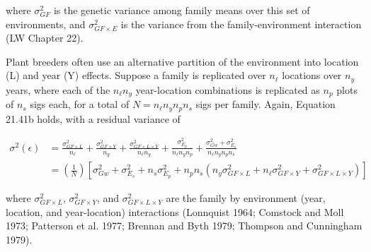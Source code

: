 \documentclass{article}
\begin{document}
where  $ \sigma_{GF}^{2} $ is the genetic variance among family means over this set of environments, and  $ \sigma_{GF \times E}^{2} $ is the variance from the family-environment interaction (LW Chapter 22).

Plant breeders often use an alternative partition of the environment into location (L) and year (Y) effects. Suppose a family is replicated over  $ n_\ell $ locations over  $ n_y $ years, where each of the  $ n_\ell n_y $ year-location combinations is replicated as  $ n_p $ plots of  $ n_s $ sigs each, for a total of  $ N = n_\ell n_y n_p n_s $ sigs per family. Again, Equation 21.41b holds, with a residual variance of

\begin{equation}
\begin{align*}\sigma^{2}(\epsilon)&=\frac{\sigma_{GF\times L}^{2}}{n_\ell}+\frac{\sigma_{GF\times Y}^{2}}{n_{y}}+\frac{\sigma_{GF\times L\times Y}^{2}}{n_\ell n_{y}}+\frac{\sigma_{E_{p}}^{2}}{n_\ell n_{y} n_{p}}+\frac{\sigma_{Gw}^{2}+\sigma_{E_{s}}^{2}}{n_\ell n_{y} n_{p} n_{s}}\\&=\left(\frac{1}{N}\right)\left[\sigma_{Gw}^{2}+\sigma_{E_{s}}^{2}+n_{s}\sigma_{E_{p}}^{2}+n_{p} n_{s}\left(n_{y}\sigma_{GF\times L}^{2}+n_\ell\sigma_{GF\times Y}^{2}+\sigma_{GF\times L\times Y}^{2}\right)\right]\end{align*}
\tag{21.42b}
\label{eq:21_42b}
\end{equation}

where  $ \sigma_{GF\times L}^{2} $,  $ \sigma_{GF\times Y}^{2} $, and  $ \sigma_{GF\times L\times Y}^{2} $ are the family by environment (year, location, and year-location) interactions (Lonnquist 1964; Comstock and Moll 1973; Patterson et al. 1977; Brennan and Byth 1979; Thompson and Cunningham 1979).
\end{document}
